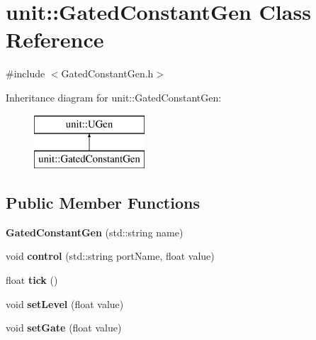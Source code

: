 \hypertarget{classunit_1_1GatedConstantGen}{\section{unit\-:\-:Gated\-Constant\-Gen Class Reference}
\label{classunit_1_1GatedConstantGen}
}


{\ttfamily \#include $<$Gated\-Constant\-Gen.\-h$>$}

Inheritance diagram for unit\-:\-:Gated\-Constant\-Gen\-:\begin{figure}[H]
\begin{center}
\leavevmode
\includegraphics[height=2.000000cm]{classunit_1_1GatedConstantGen}
\end{center}
\end{figure}
\subsection*{Public Member Functions}
\begin{DoxyCompactItemize}
\item 
\hypertarget{classunit_1_1GatedConstantGen_ad30ad26411f421228c8f7075b4d27f9a}{{\bfseries Gated\-Constant\-Gen} (std\-::string name)}\label{classunit_1_1GatedConstantGen_ad30ad26411f421228c8f7075b4d27f9a}

\item 
\hypertarget{classunit_1_1GatedConstantGen_a8365ddc2a6ddebc86e196fa381a5648d}{void {\bfseries control} (std\-::string port\-Name, float value)}\label{classunit_1_1GatedConstantGen_a8365ddc2a6ddebc86e196fa381a5648d}

\item 
\hypertarget{classunit_1_1GatedConstantGen_aafff659359fed9f28c703acd0076c081}{float {\bfseries tick} ()}\label{classunit_1_1GatedConstantGen_aafff659359fed9f28c703acd0076c081}

\item 
\hypertarget{classunit_1_1GatedConstantGen_ad7e158034a66e82387dc13bbc54b0c59}{void {\bfseries set\-Level} (float value)}\label{classunit_1_1GatedConstantGen_ad7e158034a66e82387dc13bbc54b0c59}

\item 
\hypertarget{classunit_1_1GatedConstantGen_acd088a5cda2580214ae464a56c40849a}{void {\bfseries set\-Gate} (float value)}\label{classunit_1_1GatedConstantGen_acd088a5cda2580214ae464a56c40849a}

\end{DoxyCompactItemize}
